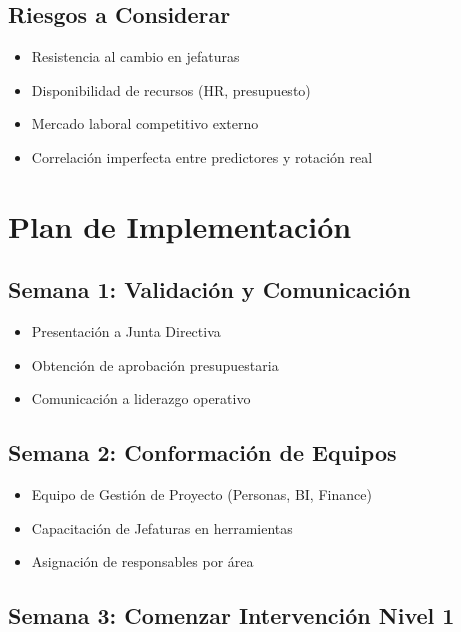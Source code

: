 \documentclass[11pt,a4paper,twoside]{article}
\begin{document}
\subsection{Riesgos a Considerar}

\begin{itemize}
    \item Resistencia al cambio en jefaturas
    \item Disponibilidad de recursos (HR, presupuesto)
    \item Mercado laboral competitivo externo
    \item Correlación imperfecta entre predictores y rotación real
\end{itemize}

\newpage

\section{Plan de Implementación}

\subsection{Semana 1: Validación y Comunicación}

\begin{itemize}
    \item Presentación a Junta Directiva
    \item Obtención de aprobación presupuestaria
    \item Comunicación a liderazgo operativo
\end{itemize}

\subsection{Semana 2: Conformación de Equipos}

\begin{itemize}
    \item Equipo de Gestión de Proyecto (Personas, BI, Finance)
    \item Capacitación de Jefaturas en herramientas
    \item Asignación de responsables por área
\end{itemize}

\subsection{Semana 3: Comenzar Intervención Nivel 1}
\end{document}
